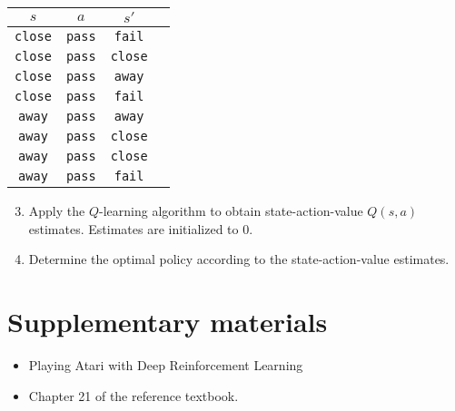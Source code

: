 \documentclass[11pt, a4paper]{article}
\begin{document}
\begin{table}[H]
    \centering
    \begin{tabular}{cccc}
        \toprule
         $s$ & $a$ & $s'$ \\
         \midrule
         \texttt{close} & \texttt{pass} & \texttt{fail} \\
         \texttt{close} & \texttt{pass} & \texttt{close} \\
         \texttt{close} & \texttt{pass} & \texttt{away} \\
         \texttt{close} & \texttt{pass} & \texttt{fail} \\
         \texttt{away} & \texttt{pass} & \texttt{away} \\
         \texttt{away} & \texttt{pass} & \texttt{close} \\
         \texttt{away} & \texttt{pass} & \texttt{close} \\
         \texttt{away} & \texttt{pass} & \texttt{fail} \\
         \bottomrule
    \end{tabular}
\end{table}

\begin{enumerate}
    \setcounter{enumi}{2}
    \item Apply the $Q$-learning algorithm to obtain state-action-value $Q(s, a)$ estimates. Estimates are initialized to 0.
    
    \item Determine the optimal policy according to the state-action-value estimates.
\end{enumerate}

\newpage

\section*{Supplementary materials}

\begin{itemize}
    \item Playing Atari with Deep Reinforcement Learning
    

    \item Chapter 21 of the reference textbook.
\end{itemize}
\end{document}
